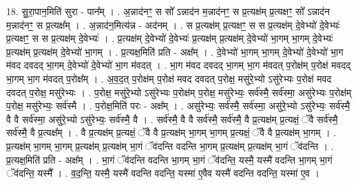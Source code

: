 \documentclass[17pt]{extarticle}
\begin{document}
18. सु॒रा॒पान॒मिति॑ सुरा - पान᳚म् । . अ॒न्नाद॑नꣳ॒॒ स सो᳚ ऽन्नाद॑न म॒न्नाद॑नꣳ॒॒ स प्र॒त्यक्ष॑म् प्र॒त्यक्षꣳ॒॒ सो᳚ ऽन्नाद॑न म॒न्नाद॑नꣳ॒॒ स प्र॒त्यक्ष᳚म् । . अ॒न्नाद॑न॒मित्य॑न्न - अद॑नम् । . स प्र॒त्यक्ष॑म् प्र॒त्यक्षꣳ॒॒ स स प्र॒त्यक्ष॑म् दे॒वेभ्यो॑ दे॒वेभ्यः॑ प्र॒त्यक्षꣳ॒॒ स स प्र॒त्यक्ष॑म् दे॒वेभ्यः॑ । . प्र॒त्यक्ष॑म् दे॒वेभ्यो॑ दे॒वेभ्यः॑ प्र॒त्यक्ष॑म् प्र॒त्यक्ष॑म् दे॒वेभ्यो॑ भा॒गम् भा॒गम् दे॒वेभ्यः॑ प्र॒त्यक्ष॑म् प्र॒त्यक्ष॑म् दे॒वेभ्यो॑ भा॒गम् । . प्र॒त्यक्ष॒मिति॑ प्रति - अक्ष᳚म् । . दे॒वेभ्यो॑ भा॒गम् भा॒गम् दे॒वेभ्यो॑ दे॒वेभ्यो॑ भा॒ग म॑वद दवदद् भा॒गम् दे॒वेभ्यो॑ दे॒वेभ्यो॑ भा॒ग म॑वदत् । . भा॒ग म॑वद दवदद् भा॒गम् भा॒ग म॑वदत् प॒रोक्ष॑म् प॒रोक्ष॑ मवदद् भा॒गम् भा॒ग म॑वदत् प॒रोक्ष᳚म् । . अ॒व॒द॒त् प॒रोक्ष॑म् प॒रोक्ष॑ मवद दवदत् प॒रोक्ष॒ मसु॑रे॒भ्यो ऽसु॑रेभ्यः प॒रोक्ष॑ मवद दवदत् प॒रोक्ष॒ मसु॑रेभ्यः । . प॒रोक्ष॒ मसु॑रे॒भ्यो ऽसु॑रेभ्यः प॒रोक्ष॑म् प॒रोक्ष॒ मसु॑रेभ्यः॒ सर्व॑स्मै॒ सर्व॑स्मा॒ असु॑रेभ्यः प॒रोक्ष॑म् प॒रोक्ष॒ मसु॑रेभ्यः॒ सर्व॑स्मै । . प॒रोक्ष॒मिति॑ परः - अक्ष᳚म् । . असु॑रेभ्यः॒ सर्व॑स्मै॒ सर्व॑स्मा॒ असु॑रे॒भ्यो ऽसु॑रेभ्यः॒ सर्व॑स्मै॒ वै वै सर्व॑स्मा॒ असु॑रे॒भ्यो ऽसु॑रेभ्यः॒ सर्व॑स्मै॒ वै । . सर्व॑स्मै॒ वै वै सर्व॑स्मै॒ सर्व॑स्मै॒ वै प्र॒त्यक्ष॑म् प्र॒त्यक्षं॒ ॅवै सर्व॑स्मै॒ सर्व॑स्मै॒ वै प्र॒त्यक्ष᳚म् । . वै प्र॒त्यक्ष॑म् प्र॒त्यक्षं॒ ॅवै वै प्र॒त्यक्ष॑म् भा॒गम् भा॒गम् प्र॒त्यक्षं॒ ॅवै वै प्र॒त्यक्ष॑म् भा॒गम् । . प्र॒त्यक्ष॑म् भा॒गम् भा॒गम् प्र॒त्यक्ष॑म् प्र॒त्यक्ष॑म् भा॒गं ॅव॑दन्ति वदन्ति भा॒गम् प्र॒त्यक्ष॑म् प्र॒त्यक्ष॑म् भा॒गं ॅव॑दन्ति । . प्र॒त्यक्ष॒मिति॑ प्रति - अक्ष᳚म् । . भा॒गं ॅव॑दन्ति वदन्ति भा॒गम् भा॒गं ॅव॑दन्ति॒ यस्मै॒ यस्मै॑ वदन्ति भा॒गम् भा॒गं ॅव॑दन्ति॒ यस्मै᳚ । . व॒द॒न्ति॒ यस्मै॒ यस्मै॑ वदन्ति वदन्ति॒ यस्मा॑ ए॒वैव यस्मै॑ वदन्ति वदन्ति॒ यस्मा॑ ए॒व । \newline
\end{document}
